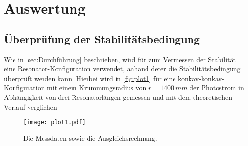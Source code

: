 \section{Auswertung}
\label{sec:Auswertung}

\subsection{Überprüfung der Stabilitätsbedingung} \label{sec:stabilitaet}
Wie in \autoref{sec:Durchführung} beschrieben, 
wird für zum Vermessen der Stabilität eine Resonator-Konfiguration verwendet,
anhand derer die Stabilitätsbedingung überprüft werden kann.
Hierbei wird in \autoref{fig:plot1} für eine konkav-konkav-Konfiguration mit einem Krümmungsradius von $r = \qty{1400}{mm}$ der Photostrom in Abhängigkeit von drei Resonatorlängen gemessen
und mit dem theoretischen Verlauf verglichen.
\begin{figure}
    \centering
    \texttt{[image: plot1.pdf]}
    \caption{Die Messdaten sowie die Ausgleichsrechnung.}
    \label{fig:plot1}
\end{figure}


